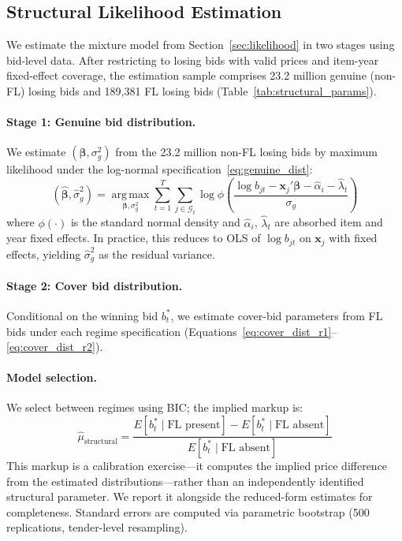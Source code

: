 
\subsection{Structural Likelihood Estimation}
\label{sec:structural_estimation}

We estimate the mixture model from Section~\ref{sec:likelihood} in two stages using bid-level data. After restricting to losing bids with valid prices and item-year fixed-effect coverage, the estimation sample comprises 23.2 million genuine (non-FL) losing bids and 189,381 FL losing bids (Table~\ref{tab:structural_params}).

\paragraph{Stage 1: Genuine bid distribution.}
We estimate $(\boldsymbol{\beta}, \sigma_g^2)$ from the 23.2 million non-FL losing bids by maximum likelihood under the log-normal specification~\eqref{eq:genuine_dist}:
\begin{equation}
  (\hat{\boldsymbol{\beta}}, \hat{\sigma}_g^2) =
  \operatorname*{arg\,max}_{\boldsymbol{\beta}, \sigma_g^2}
  \sum_{t=1}^{T} \sum_{j \in \mathcal{G}_t}
  \log \phi\!\left(
    \frac{\log b_{jt} - \mathbf{x}_j'\boldsymbol{\beta}
    - \hat{\alpha}_i - \hat{\lambda}_t}{\sigma_g}
  \right)
  \label{eq:mle_genuine}
\end{equation}
where $\phi(\cdot)$ is the standard normal density and $\hat{\alpha}_i$, $\hat{\lambda}_t$ are absorbed item and year fixed effects. In practice, this reduces to OLS of $\log b_{jt}$ on $\mathbf{x}_j$ with fixed effects, yielding $\hat{\sigma}_g^2$ as the residual variance.

\paragraph{Stage 2: Cover bid distribution.}
Conditional on the winning bid $b^*_t$, we estimate cover-bid parameters from FL bids under each regime specification (Equations~\ref{eq:cover_dist_r1}--\ref{eq:cover_dist_r2}).

\paragraph{Model selection.}
We select between regimes using BIC; the implied markup is:
\begin{equation}
  \hat{\mu}_{\text{structural}} =
  \frac{E[b^*_t \mid \text{FL present}] -
        E[b^*_t \mid \text{FL absent}]}{E[b^*_t \mid \text{FL absent}]}
  \label{eq:structural_markup}
\end{equation}
This markup is a calibration exercise---it computes the implied price
difference from the estimated distributions---rather than an
independently identified structural parameter. We report it alongside
the reduced-form estimates for completeness. Standard errors are
computed via parametric bootstrap (500 replications, tender-level
resampling).

